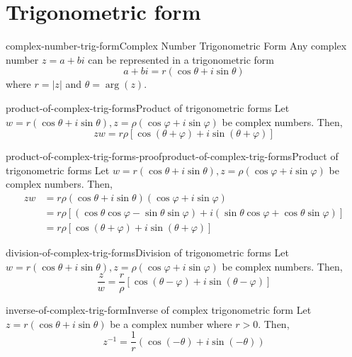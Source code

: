 \documentclass[preview]{standalone}
\begin{document}
\genpage

\section{Trigonometric form}

\begin{snippettheorem}{complex-number-trig-form}{Complex Number Trigonometric Form}
    Any complex number \(z=a+bi\) can be represented in a trigonometric form
    \[
        a+bi=r(\cos\theta+i\sin\theta)
    \]
    where \(r=|z|\) and \(\theta = \arg(z)\).
\end{snippettheorem}

\begin{snippetproposition}{product-of-complex-trig-forms}{Product of trigonometric forms}
    Let \(w = r(\cos\theta + i\sin\theta), z = \rho(\cos\varphi + i\sin\varphi)\) be complex numbers. Then,
    \[
        zw = r\rho \left[ \cos(\theta + \varphi) + i\sin(\theta + \varphi) \right]
    \]
\end{snippetproposition}

\begin{snippetproof}{product-of-complex-trig-forms-proof}{product-of-complex-trig-forms}{Product of trigonometric forms}
    Let \(w = r(\cos\theta + i\sin\theta), z = \rho(\cos\varphi + i\sin\varphi)\) be complex numbers. Then,
    \begin{align*}
        zw &= r\rho (\cos\theta + i\sin\theta)(\cos\varphi + i\sin\varphi) \\
        &= r\rho \left[ (\cos\theta\cos\varphi - \sin\theta\sin\varphi) + i(\sin\theta\cos\varphi + \cos\theta\sin\varphi) \right] \\
        &= r\rho \left[ \cos(\theta + \varphi) + i\sin(\theta + \varphi) \right]
    \end{align*}
\end{snippetproof}

\begin{snippetproposition}{division-of-complex-trig-forms}{Division of trigonometric forms}
    Let \(w = r(\cos\theta + i\sin\theta), z = \rho(\cos\varphi + i\sin\varphi)\) be complex numbers. Then,
    \[
        \frac{z}{w} = \frac{r}{\rho} \left[ \cos(\theta - \varphi) + i\sin(\theta - \varphi) \right]
    \]
\end{snippetproposition}

\begin{snippetproposition}{inverse-of-complex-trig-form}{Inverse of complex trigonometric form}
    Let \(z = r(\cos\theta + i\sin\theta)\) be a complex number where \(r>0\). Then,
    \[
        z^{-1} = \frac{1}{r}(\cos(-\theta) + i\sin(-\theta))
    \]
\end{snippetproposition}
\end{document}
